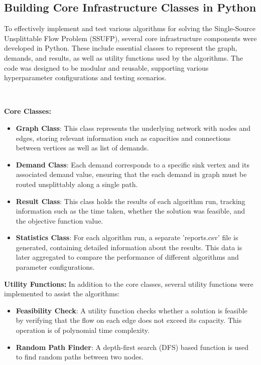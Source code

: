 \documentclass[a4paper,12pt]{article}
\begin{document}
\subsection{Building Core Infrastructure Classes in Python}

To effectively implement and test various algorithms for solving the Single-Source Unsplittable Flow Problem (SSUFP), several core infrastructure components were developed in Python. These include essential classes to represent the graph, demands, and results, as well as utility functions used by the algorithms. The code was designed to be modular and reusable, supporting various hyperparameter configurations and testing scenarios.

\

\noindent \textbf{Core Classes:}

\begin{itemize}
    \item \textbf{Graph Class}: This class represents the underlying network with nodes and edges, storing relevant information such as capacities and connections between vertices as well as list of demands.
    \item \textbf{Demand Class}: Each demand corresponds to a specific sink vertex and its associated demand value, ensuring that the each demand in graph must be routed unsplittably along a single path.
    \item \textbf{Result Class}: This class holds the results of each algorithm run, tracking information such as the time taken, whether the solution was feasible, and the objective function value.
    \item \textbf{Statistics Class}: For each algorithm run, a separate 'reports.csv' file is generated, containing detailed information about the results. This data is later aggregated to compare the performance of different algorithms and parameter configurations.

\end{itemize}

\noindent \textbf{Utility Functions:}
In addition to the core classes, several utility functions were implemented to assist the algorithms:
\begin{itemize}
    \item \textbf{Feasibility Check}: A utility function checks whether a solution is feasible by verifying that the flow on each edge does not exceed its capacity. This operation is of polynomial time complexity.
    \item \textbf{Random Path Finder}: A depth-first search (DFS) based function is used to find random paths between two nodes.
\end{itemize}
\end{document}
